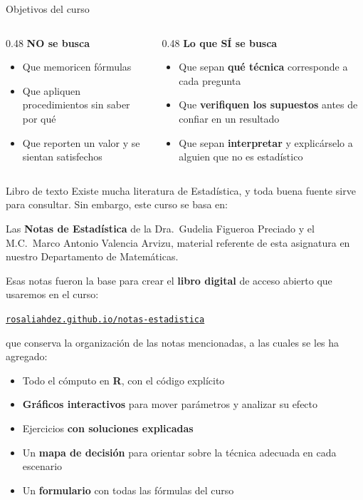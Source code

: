 \documentclass[aspectratio=169,10pt]{beamer}
\newcommand{\destaca}[1]{%
  \par\vspace{3pt}\noindent
  \colorbox{azulClaro}{%
    \parbox{\dimexpr\linewidth-2\fboxsep\relax}{\vspace{3pt}#1\vspace{3pt}}}%
  \par\vspace{3pt}}
\begin{document}
\begin{frame}{Objetivos del curso}
  \begin{columns}[T]
    \begin{column}{0.48\textwidth}
      \textcolor{rojoAc}{\textbf{NO se busca}}
      \begin{itemize}
        \item Que memoricen fórmulas
        \item Que apliquen procedimientos sin saber por qué
        \item Que reporten un valor y se sientan satisfechos
      \end{itemize}
    \end{column}
    \begin{column}{0.48\textwidth}
      \textcolor{verdeOk}{\textbf{Lo que SÍ se busca}}
      \begin{itemize}
        \item Que sepan \textbf{qué técnica} corresponde a cada pregunta
        \item Que \textbf{verifiquen los supuestos} antes de confiar en un resultado
        \item Que sepan \textbf{interpretar} y explicárselo a alguien que no es estadístico
      \end{itemize}
    \end{column}
  \end{columns}
\end{frame}
\begin{frame}{Libro de texto}
  Existe mucha literatura de Estadística, y toda buena fuente sirve para consultar. Sin embargo, este curso se basa en:
  \destaca{Las \textbf{Notas de Estadística} de la Dra.~Gudelia Figueroa Preciado y el
  M.C.~Marco Antonio Valencia Arvizu, material referente de esta asignatura en nuestro  Departamento de Matemáticas.}
  Esas notas fueron la base para crear el \textbf{libro digital} de acceso abierto que usaremos en el curso:
\begin{center}
\href{https://rosaliahdez.github.io/notas-estadistica/}{\texttt{rosaliahdez.github.io/notas-estadistica}}
\end{center}
que conserva la organización de las notas mencionadas, a las cuales se les ha agregado:
  \begin{itemize}
    \item Todo el cómputo en \textbf{R}, con el código explícito
    \item \textbf{Gráficos interactivos} para mover parámetros y analizar su efecto
    \item Ejercicios \textbf{con soluciones explicadas}
    \item Un \textbf{mapa de decisión} para orientar sobre la técnica adecuada en cada escenario
    \item Un \textbf{formulario} con todas las fórmulas del curso
  \end{itemize}
\end{frame}
\end{document}
